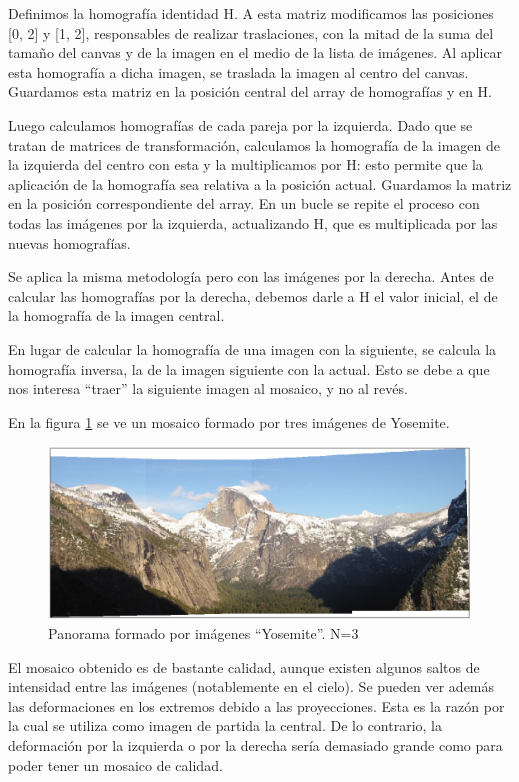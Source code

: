 \documentclass[12pt,spanish]{article} %
\begin{document}
Definimos la homografía identidad H. A esta matriz modificamos las posiciones [0, 2] y [1, 2], responsables de realizar traslaciones, con la mitad de la suma del tamaño del canvas y de la imagen en el medio de la lista de imágenes. Al aplicar esta homografía a dicha imagen, se traslada la imagen al centro del canvas. Guardamos esta matriz en la posición central del array de homografías y en H.

Luego calculamos homografías de cada pareja por la izquierda. Dado que se tratan de matrices de transformación, calculamos la homografía de la imagen de la izquierda del centro con esta y la multiplicamos por H: esto permite que la aplicación de la homografía sea relativa a la posición actual. Guardamos la matriz en la posición correspondiente del array. En un bucle se repite el proceso con todas las imágenes por la izquierda, actualizando H, que es multiplicada por las nuevas homografías.

Se aplica la misma metodología pero con las imágenes por la derecha. Antes de calcular las homografías por la derecha, debemos darle a H el valor inicial, el de la homografía de la imagen central.

En lugar de calcular la homografía de una imagen con la siguiente, se calcula la homografía inversa, la de la imagen siguiente con la actual. Esto se debe a que nos interesa ``traer'' la siguiente imagen al mosaico, y no al revés.

En la figura \ref{fig:panorama1} se ve un mosaico formado por tres imágenes de Yosemite.

\begin{figure}[H]
  \begin{center}
  \includegraphics[scale=.55]{panorama1}
  \caption{Panorama formado por imágenes ``Yosemite''. N=3}
  \label{fig:panorama1}
  \end{center}
\end{figure}

El mosaico obtenido es de bastante calidad, aunque existen algunos saltos de intensidad entre las imágenes (notablemente en el cielo). Se pueden ver además las deformaciones en los extremos debido a las proyecciones. Esta es la razón por la cual se utiliza como imagen de partida la central. De lo contrario, la deformación por la izquierda o por la derecha sería demasiado grande como para poder tener un mosaico de calidad.
\end{document}
